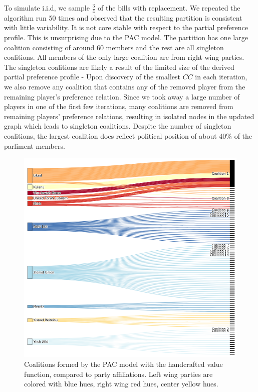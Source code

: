 \documentclass[letterpaper]{article} %
\begin{document}
To simulate i.i.d, we sample $\frac{3}{4}$ of the bills with replacement. We repeated the algorithm run 50 times and observed that the resulting partition is consistent with little variability. It is not core stable with respect to the partial preference profile. This is unsurprising due to the PAC model. The partition has one large coalition consisting of around 60 members and the rest are all singleton coalitions. All members of the only large coalition are from right wing parties. The singleton coalitions are likely a result of the limited size of the derived partial preference profile - Upon discovery of the smallest $CC$ in each iteration, we also remove any coalition that contains any of the removed player from the remaining player's preference relation. Since we took away a large number of players in one of the first few iterations, many coalitions are removed from remaining players' preference relations, resulting in isolated nodes in the updated graph which leads to singleton coalitions. Despite the number of singleton coalitions, the largest coalition does reflect political position of about 40\% of the parliment members.

\begin{figure}[htb]
\includegraphics[width=\columnwidth]{pac_value_function}
\caption{Coalitions formed by the PAC model with the handcrafted value function, compared to party affiliations. Left wing parties are colored with blue hues, right wing red hues, center yellow hues.}
\end{figure}
\end{document}
